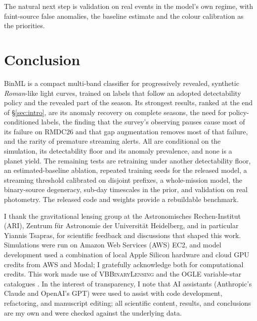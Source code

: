 \documentclass[twocolumn,linenumbers,floatfix,twocolappendix]{aastex701}
\newcommand{\Rom}{\textit{Roman}}
\begin{document}
The natural next step is validation on real events in the model's own regime, with faint-source false anomalies, the
baseline estimate and the colour calibration as the priorities.

\section{Conclusion}\label{sec:conclusion}

BinML is a compact multi-band classifier for progressively revealed, synthetic \Rom{}-like light curves, trained on
labels that follow an adopted detectability policy and the revealed part of the season. Its strongest results, ranked
at the end of \S\ref{sec:intro}, are its anomaly recovery on complete seasons, the need for policy-conditioned labels,
the finding that the survey's observing pauses cause most of its failure on RMDC26 and that gap augmentation
removes most of that failure, and the rarity of premature streaming alerts. All are conditional on the simulation, its detectability floor and its
anomaly prevalence, and none is a planet yield. The remaining tests are retraining under another detectability floor,
an estimated-baseline ablation, repeated training seeds for the released model, a streaming threshold calibrated on
disjoint prefixes, a whole-mission model, the binary-source degeneracy, sub-day timescales in the prior, and validation
on real photometry. The released code and weights provide a rebuildable benchmark.

\begin{acknowledgments}
I thank the gravitational lensing group at the Astronomisches Rechen-Institut (ARI), Zentrum für
Astronomie der Universität Heidelberg, and in particular Yiannis Tsapras, for scientific feedback
and discussions that shaped this work.
Simulations were run on Amazon Web Services (AWS) EC2, and
model development used a combination of local Apple Silicon hardware and cloud GPU credits from
AWS and Modal; I gratefully acknowledge both for computational credits. This work made use of
\textsc{VBBinaryLensing} \citep{Bozza2018} and the OGLE variable-star catalogues
\citep{Soszynski2013,Soszynski2014}. In the interest of transparency, I note that AI assistants
(Anthropic's Claude and OpenAI's GPT) were used to assist with code development, refactoring, and
manuscript editing; all scientific content, results, and conclusions are my own and were checked
against the underlying data.
\end{acknowledgments}
\end{document}
